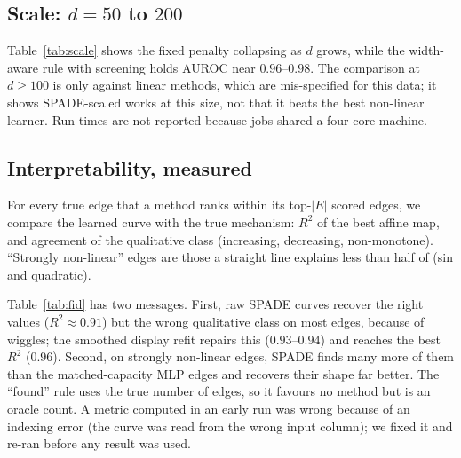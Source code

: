 \documentclass[11pt]{article}
\begin{document}
\subsection{Scale: $d=50$ to $200$}
\begin{table}[t]\centering\small
\caption{Fresh seeds 600--602, $n=3{,}000$. SPADE-scaled: $\lambda_g=\min(0.01,0.2/d)$ and parent screening
($K=15$). GOLEM and NOTEARS-MLP were run only at $d=50$ (each fit exceeded 15 minutes); non-linear competitors
(NoGAM, DAGMA-nonlinear, GraN-DAG) cannot run at $d\ge100$ and SCORE did not finish within our budget.}
\label{tab:scale}
\end{table}
Table~\ref{tab:scale} shows the fixed penalty collapsing as $d$ grows, while the width-aware rule with screening
holds AUROC near $0.96$--$0.98$. The comparison at $d\ge100$ is only against linear methods, which are
mis-specified for this data; it shows SPADE-scaled works at this size, not that it beats the best non-linear learner.
Run times are not reported because jobs shared a four-core machine.

\subsection{Interpretability, measured}
For every true edge that a method ranks within its top-$|E|$ scored edges, we compare the learned curve with the
true mechanism: $R^2$ of the best affine map, and agreement of the qualitative class (increasing, decreasing,
non-monotone). ``Strongly non-linear'' edges are those a straight line explains less than half of (sin and quadratic).
\begin{table}[t]\centering\small
\caption{Shape fidelity on fresh seeds 400--419. MLP-edge: same bottleneck, penalty and budget with $1\!\to\!3\!\to\!1$
$\tanh$ edges. SPADE-2stage: structure from the plain SPADE fit, curves from the smoothed refit.}
\label{tab:fid}
\end{table}
Table~\ref{tab:fid} has two messages. First, raw SPADE curves recover the right values ($R^2\approx0.91$) but the wrong
qualitative class on most edges, because of wiggles; the smoothed display refit repairs this ($0.93$--$0.94$) and
reaches the best $R^2$ ($0.96$). Second, on strongly non-linear edges, SPADE finds many more of them than the
matched-capacity MLP edges and recovers their shape far better. The ``found'' rule uses the true number of
edges, so it favours no method but is an oracle count. A metric computed in an early run was wrong because of an
indexing error (the curve was read from the wrong input column); we fixed it and re-ran before any result was used.
\end{document}
